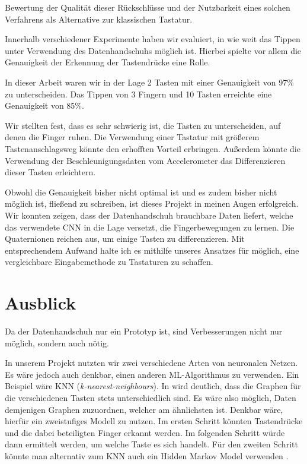 \begin{displayquote}
    Bewertung der Qualität dieser Rückschlüsse und der Nutzbarkeit eines solchen Verfahrens als Alternative zur klassischen Tastatur.
\end{displayquote}

Innerhalb verschiedener Experimente haben wir evaluiert, in wie weit das Tippen unter Verwendung des Datenhandschuhs möglich ist. Hierbei spielte vor allem die Genauigkeit der Erkennung der Tastendrücke eine Rolle.

In dieser Arbeit waren wir in der Lage 2 Tasten mit einer Genauigkeit von 97\% zu unterscheiden. Das Tippen von 3 Fingern und 10 Tasten erreichte eine Genauigkeit von 85\%.

Wir stellten fest, dass es sehr schwierig ist, die Tasten zu unterscheiden, auf denen die Finger ruhen. Die Verwendung einer Tastatur mit größerem Tastenanschlagsweg könnte den erhofften Vorteil erbringen. Außerdem könnte die Verwendung der Beschleunigungsdaten vom Accelerometer das Differenzieren dieser Tasten erleichtern.

Obwohl die Genauigkeit bisher nicht optimal ist und es zudem bisher nicht möglich ist, fließend zu schreiben, ist dieses Projekt in meinen Augen erfolgreich. Wir konnten zeigen, dass der Datenhandschuh brauchbare Daten liefert, welche das verwendete CNN in die Lage versetzt, die Fingerbewegungen zu lernen. Die Quaternionen reichen aus, um einige Tasten zu differenzieren. Mit entsprechendem Aufwand halte ich es mithilfe unseres Ansatzes für möglich, eine vergleichbare Eingabemethode zu Tastaturen zu schaffen.

\section{Ausblick}

Da der Datenhandschuh nur ein Prototyp ist, sind Verbesserungen nicht nur möglich, sondern auch nötig.

In unserem Projekt nutzten wir zwei verschiedene Arten von neuronalen Netzen. Es wäre jedoch auch denkbar, einen anderen ML-Algorithmus zu verwenden. Ein Beispiel wäre KNN (\emph{k-nearest-neighbours}). In  wird deutlich, dass die Graphen für die verschiedenen Tasten stets unterschiedlich sind. Es wäre also möglich, Daten demjenigen Graphen zuzuordnen, welcher am ähnlichsten ist. Denkbar wäre, hierfür ein zweistufiges Modell zu nutzen. Im ersten Schritt könnten Tastendrücke und die dabei beteiligten Finger erkannt werden. Im folgenden Schritt würde dann ermittelt werden, um welche Taste es sich handelt. Für den zweiten Schritt könnte man alternativ zum KNN auch ein Hidden Markov Model verwenden \citep[wie in][]{nasa-joystick-keyboard}.

